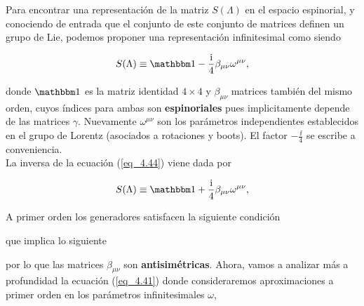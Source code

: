 Para encontrar una representación de la matriz $S(\Lambda)$ en el espacio espinorial, y conociendo de entrada que el conjunto de este conjunto de matrices definen un grupo de Lie, podemos proponer una representación infinitesimal como siendo

\begin{equation}
	S(\Lambda) \equiv \idnt - \frac{\ii}{4} \beta_{\mu \nu} \omega^{\mu \nu},
	\label{eq_4.44}
\end{equation} 

donde $\idnt$ es la matriz identidad $4\times 4$ y $ \beta_{\mu \nu} $ matrices también del mismo orden, cuyos índices para ambas son \textbf{espinoriales} pues implicitamente depende de las matrices $\gamma$. Nuevamente $ \omega^{\mu \nu} $ son los parámetros independientes establecidos en el grupo de Lorentz (asociados a rotaciones y boots). El factor $ - \frac{\ii}{4} $ se escribe a conveniencia. \\
 
 La inversa de la ecuación (\ref{eq_4.44}) viene dada por
 
 \begin{equation}
 	S(\Lambda) \equiv \idnt + \frac{\ii}{4} \beta_{\mu \nu} \omega^{\mu \nu},
 	\label{eq_4.45}
 \end{equation} 
 
A primer orden los generadores satisfacen la siguiente condición

que implica lo siguiente 

por lo que las matrices $\beta_{\mu \nu}$ son \textbf{antisimétricas}. Ahora, vamos a analizar más a profundidad la ecuación (\ref{eq_4.41}) donde consideraremos aproximaciones a primer orden en los parámetros infinitesimales $\omega$, 

